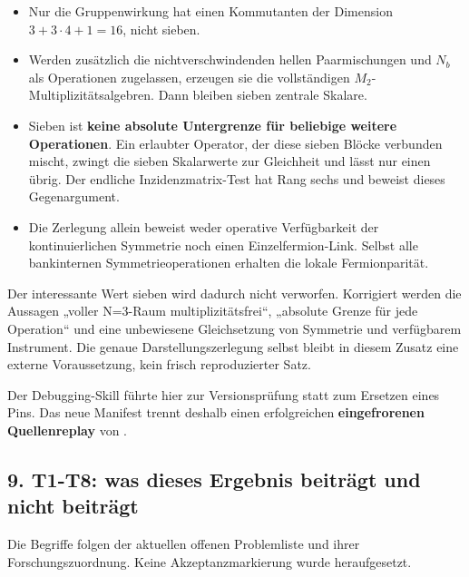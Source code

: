 \begin{itemize}
\tightlist
\item
  Nur die Gruppenwirkung hat einen Kommutanten der Dimension
  \(3+3\cdot4+1=16\), nicht sieben.
\item
  Werden zusätzlich die nichtverschwindenden hellen Paarmischungen und
  \(N_b\) als Operationen zugelassen, erzeugen sie die vollständigen
  \(M_2\)-Multiplizitätsalgebren. Dann bleiben sieben zentrale Skalare.
\item
  Sieben ist \textbf{keine absolute Untergrenze für beliebige weitere
  Operationen}. Ein erlaubter Operator, der diese sieben Blöcke
  verbunden mischt, zwingt die sieben Skalarwerte zur Gleichheit und
  lässt nur einen übrig. Der endliche Inzidenzmatrix-Test hat Rang sechs
  und beweist dieses Gegenargument.
\item
  Die Zerlegung allein beweist weder operative Verfügbarkeit der
  kontinuierlichen Symmetrie noch einen Einzelfermion-Link. Selbst alle
  bankinternen Symmetrieoperationen erhalten die lokale Fermionparität.
\end{itemize}

Der interessante Wert sieben wird dadurch nicht verworfen. Korrigiert
werden die Aussagen „voller N=3-Raum multiplizitätsfrei``, „absolute
Grenze für jede Operation`` und eine unbewiesene Gleichsetzung von
Symmetrie und verfügbarem Instrument. Die genaue Darstellungszerlegung
selbst bleibt in diesem Zusatz eine externe Voraussetzung, kein frisch
reproduzierter Satz.

Der Debugging-Skill führte hier zur Versionsprüfung statt zum Ersetzen
eines Pins. Das neue Manifest trennt deshalb einen erfolgreichen
\textbf{eingefrorenen Quellenreplay} von
.

\subsection{9. T1-T8: was dieses Ergebnis beiträgt und nicht
beiträgt}\label{t1-t8-was-dieses-ergebnis-beitruxe4gt-und-nicht-beitruxe4gt}

Die Begriffe folgen der aktuellen offenen Problemliste und ihrer
Forschungszuordnung. Keine Akzeptanzmarkierung wurde heraufgesetzt.

